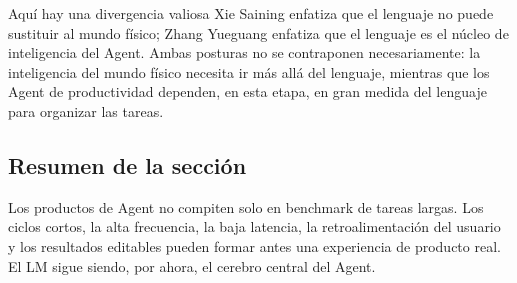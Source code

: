 \begin{warningbox}{Aquí hay una divergencia valiosa}
Xie Saining enfatiza que el lenguaje no puede sustituir al mundo físico; Zhang Yueguang enfatiza que el lenguaje es el núcleo de inteligencia del Agent. Ambas posturas no se contraponen necesariamente: la inteligencia del mundo físico necesita ir más allá del lenguaje, mientras que los Agent de productividad dependen, en esta etapa, en gran medida del lenguaje para organizar las tareas.
\end{warningbox}

\subsection{Resumen de la sección}

Los productos de Agent no compiten solo en benchmark de tareas largas. Los ciclos cortos, la alta frecuencia, la baja latencia, la retroalimentación del usuario y los resultados editables pueden formar antes una experiencia de producto real. El LM sigue siendo, por ahora, el cerebro central del Agent.
